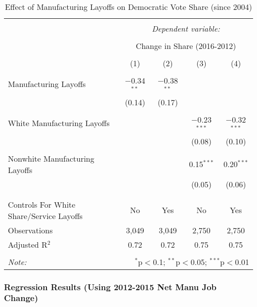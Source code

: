 \documentclass[
  12pt,
]{article}
\begin{document}
\begin{table}[!htbp] \centering 
  \caption{Effect of Manufacturing Layoffs on Democratic Vote Share (since 2004)} 
  \label{} 
\begin{tabular}{@{\extracolsep{5pt}}lcccc} 
\\[-1.8ex]\hline 
\hline \\[-1.8ex] 
 & \multicolumn{4}{c}{\textit{Dependent variable:}} \\ 
\cline{2-5} 
\\[-1.8ex] & \multicolumn{4}{c}{Change in Share (2016-2012)} \\ 
\\[-1.8ex] & (1) & (2) & (3) & (4)\\ 
\hline \\[-1.8ex] 
 Manufacturing Layoffs & $-$0.34$^{**}$ & $-$0.38$^{**}$ &  &  \\ 
  & (0.14) & (0.17) &  &  \\ 
  & & & & \\ 
 White Manufacturing Layoffs &  &  & $-$0.23$^{***}$ & $-$0.32$^{***}$ \\ 
  &  &  & (0.08) & (0.10) \\ 
  & & & & \\ 
 Nonwhite Manufacturing Layoffs &  &  & 0.15$^{***}$ & 0.20$^{***}$ \\ 
  &  &  & (0.05) & (0.06) \\ 
  & & & & \\ 
\hline \\[-1.8ex] 
Controls For White Share/Service Layoffs & No & Yes & No & Yes \\ 
Observations & 3,049 & 3,049 & 2,750 & 2,750 \\ 
Adjusted R$^{2}$ & 0.72 & 0.72 & 0.75 & 0.75 \\ 
\hline 
\hline \\[-1.8ex] 
\textit{Note:}  & \multicolumn{4}{r}{$^{*}$p$<$0.1; $^{**}$p$<$0.05; $^{***}$p$<$0.01} \\ 
\end{tabular} 
\end{table}

\newpage

\hypertarget{regression-results-using-2012-2015-net-manu-job-change}{%
\subsubsection{Regression Results (Using 2012-2015 Net Manu Job
Change)}\label{regression-results-using-2012-2015-net-manu-job-change}}
\end{document}
